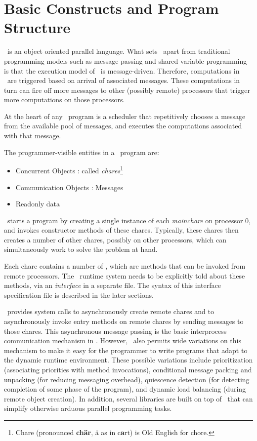 \section{Basic Constructs and Program Structure}

\charmpp\ is an object oriented parallel language. What sets \charmpp\ apart
from traditional programming models such as message passing and shared variable
programming is that the execution model of \charmpp\ is message-driven.
Therefore, computations in \charmpp\ are triggered based on arrival of
associated messages. These computations in turn can fire off more messages to
other (possibly remote) processors that trigger more computations on those
processors.

At the heart of any \charmpp\ program is a scheduler that repetitively chooses
a message from the available pool of messages, and executes the computations
associated with that message.

The programmer-visible entities in a \charmpp\ program are:

\begin{itemize}
\item Concurrent Objects : called {\em chares}\footnote{
      Chare (pronounced {\bf ch\"ar}, \"a as in c{\bf a}rt) is Old 
      English for chore.
      }
\item Communication Objects : Messages
\item Readonly data
\end{itemize}

\charmpp\ starts a program by creating a single  instance of each
{\em mainchare} on processor 0, and invokes constructor methods of these
chares.  Typically, these chares then creates a number of other 
chares, possibly on other processors, which can simultaneously work to solve
the problem at hand.

Each chare contains a number of , which are methods that can be invoked from remote processors. The
\charmpp\ runtime system needs to be explicitly told about these methods, via
an {\em interface} in a separate file.  The syntax of this interface
specification file is described in the later sections.

\charmpp\ provides system calls to asynchronously create remote 
chares and to asynchronously invoke entry methods on remote chares by sending
 messages to those chares. This asynchronous
message passing is the basic interprocess communication
mechanism in \charmpp. However, \charmpp\ also permits wide variations on this
mechanism to make it easy for the programmer to write programs that adapt to
the dynamic runtime environment.  These possible variations include
prioritization (associating priorities with method invocations), conditional
message packing and unpacking (for reducing messaging
overhead), quiescence detection (for detecting completion of
some phase of the program), and dynamic load balancing (during remote object
creation). In addition, several libraries are built on top of \charmpp\ that
can simplify otherwise arduous parallel programming tasks.

